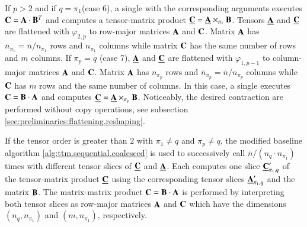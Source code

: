 If $p>2$ and if $q=\pi_1$(case 6), a single  with the corresponding arguments executes $\mathbf{C} = \mathbf{A} \cdot \mathbf{B}^T$ and computes a tensor-matrix product $\underline{\mathbf{C}} = \underline{\mathbf{A}} \times_{\pi_1} \mathbf{B}$.
Tensors $\underline{\mathbf{A}}$ and $\underline{\mathbf{C}}$ are flattened with $\varphi_{2,p}$ to row-major matrices $\mathbf{A}$ and $\mathbf{C}$.
Matrix $\mathbf{A}$ has $\bar{n}_{\pi_1} = \bar{n} / n_{\pi_1}$ rows and $n_{\pi_1}$ columns while matrix $\mathbf{C}$ has the same number of rows and $m$ columns.
If $\pi_p=q$ (case 7), $\underline{\mathbf{A}}$ and $\underline{\mathbf{C}}$ are flattened with $\varphi_{1,p-1}$ to column-major matrices $\mathbf{A}$ and $\mathbf{C}$.
Matrix $\mathbf{A}$ has $n_{\pi_p}$ rows and $\bar{n}_{\pi_p} =  \bar{n} / n_{\pi_p}$ columns while $\mathbf{C}$ has $m$ rows and the same number of columns.
In this case, a single  executes $\mathbf{C} = \mathbf{B} \cdot \mathbf{A}$ and computes $\underline{\mathbf{C}} = \underline{\mathbf{A}} \times_{\pi_p} \mathbf{B}$.
Noticeably, the desired contraction are performed without copy operations, see subsection \ref{sec:preliminaries:flattening.reshaping}. 

If the tensor order is greater than $2$ with $\pi_1\neq q$ and $\pi_p \neq q$, the modified baseline algorithm \ref{alg:ttm.sequential.coalesced} is used to successively call $\bar{n} / (n_q \cdot n_{\pi_1})$ times  with different tensor slices of $\underline{\mathbf{C}}$ and $\underline{\mathbf{A}}$.
Each  computes one slice $\underline{\mathbf{C}}_{\pi_1,q}'$ of the tensor-matrix product $\underline{\mathbf{C}}$ using the corresponding tensor slices $\underline{\mathbf{A}}_{\pi_1,q}'$ and the matrix $\mathbf{B}$.
The matrix-matrix product $\mathbf{C} = \mathbf{B} \cdot \mathbf{A}$ is performed by interpreting both tensor slices as row-major matrices $\mathbf{A}$ and $\mathbf{C}$ which have the dimensions $(n_q,n_{\pi_1})$ and $(m,n_{\pi_1})$, respectively.

